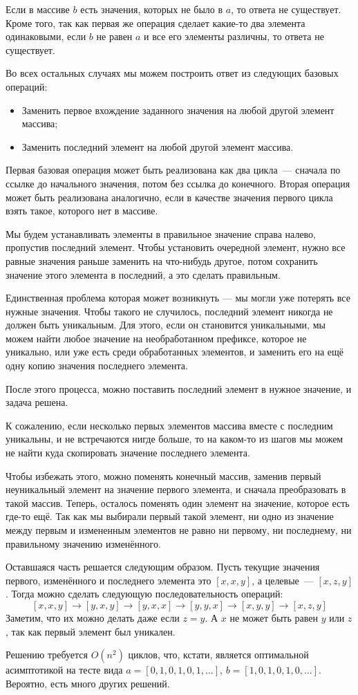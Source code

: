 Если в массиве $b$ есть значения, которых не было в $a$, то ответа не существует.
Кроме того, так как первая же операция сделает какие-то два элемента одинаковыми, если $b$ не равен $a$ и все его элементы различны, то ответа не существует.

Во всех остальных случаях мы можем построить ответ из следующих базовых операций:
\begin{itemize}
 \item Заменить первое вхождение заданного значения на любой другой элемент массива;
 \item Заменить последний элемент на любой другой элемент массива.
\end{itemize}

Первая базовая операция может быть реализована как два цикла~--- сначала по ссылке до начального значения, потом без ссылка до конечного. Вторая операция может быть реализована аналогично, если в качестве значения первого цикла взять такое, которого нет в массиве.

Мы будем устанавливать элементы в правильное значение справа налево, пропустив последний элемент.
Чтобы установить очередной элемент, нужно все равные значения раньше заменить на что-нибудь другое, потом сохранить значение этого элемента в последний, а это сделать правильным.

Единственная проблема которая может возникнуть --- мы могли уже потерять все нужные значения. Чтобы такого не случилось, последний элемент никогда не должен быть уникальным. Для этого, если он становится уникальными, мы можем найти любое значение на необработанном префиксе, которое не уникально, или уже есть среди обработанных элементов, и заменить его на ещё одну копию значения последнего элемента.

После этого процесса, можно поставить последний элемент в нужное значение, и задача решена.

К сожалению, если несколько первых элементов массива вместе с последним уникальны, и не встречаются нигде больше, то на каком-то из шагов мы можем не найти куда скопировать значение последнего элемента.

Чтобы избежать этого, можно поменять конечный массив, заменив первый неуникальный элемент на значение первого элемента, и сначала преобразовать в такой массив.
Теперь, осталось поменять один элемент на значение, которое есть где-то ещё.
Так как мы выбирали первый такой элемент, ни одно из значение между первым и измененным элементов не равно ни первому, ни последнему, ни правильному значению изменённого.

Оставшаяся часть решается следующим образом. Пусть текущие значения первого, изменённого и последнего элемента это $[x, x, y]$, а целевые~--- $[x, z, y]$.
Тогда можно сделать следующую последовательность операций: $$[x, x, y] \rightarrow [y, x, y] \rightarrow [y, x, x] \rightarrow [y, y, x] \rightarrow [x, y, y] \rightarrow [x, z, y]$$
Заметим, что их можно делать даже если $z = y$. А $x$ не может быть равен  $y$ или $z$, так как первый элемент был уникален.

Решению требуется $O(n^2)$ циклов, что, кстати, является оптимальной асимптотикой на тесте вида $a = [0, 1, 0, 1, 0, 1, \dots]$, $b = [1, 0, 1, 0, 1, 0, \dots]$. Вероятно, есть много других решений.